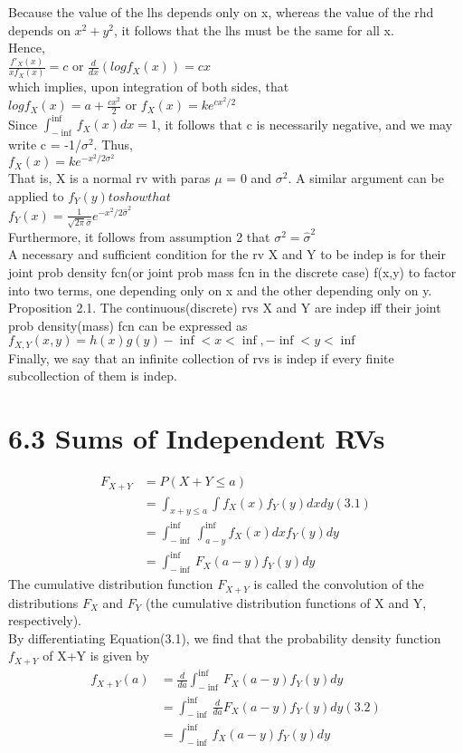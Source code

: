 \documentclass{article}
\begin{document}
Because the value of the lhs depends only on x, whereas the value of the rhd depends on $x^2 + y^2$, it follows that the lhs must be the same for all x. \\
Hence,\\
$\frac{f'_X(x)}{x f_X(x)}=c$ or $\frac{d}{dx}(log f_X(x))=c x$\\
which implies, upon integration of both sides, that \\
$log f_X(x)= a + \frac{cx^2}{2}$ or $f_X(x)=k e^{c x^2/2}$\\
Since $\int_{-\inf}^{\inf}f_X(x)dx =1$, it follows that c is necessarily negative, and we may write c = -1/$\sigma^2$. Thus, \\
$f_X(x)=k e^{-x^2/2\sigma^2}$\\
That is, X is a normal rv with paras $\mu$ = 0 and $\sigma^2$. A similar argument can be applied to $f_Y(y) to show that$ \\ 
$f_Y(x)=\frac{1}{\sqrt{2\pi}\hat{\sigma}}e^{-x^2/2\hat{\sigma}^2}$\\
Furthermore, it follows from assumption 2 that $\sigma^2 = \hat{\sigma}^2$  \\
A necessary and sufficient condition for the rv X and  Y to be indep is for their joint prob density fcn(or joint prob mass fcn in the discrete case) f(x,y) to factor into two terms, one depending only on x and the other depending only on y. \\
Proposition 2.1. The continuous(discrete) rvs X and Y are indep iff their joint prob density(mass) fcn can be expressed as \\
$f_{X,Y}(x,y) = h(x)g(y) -\inf < x < \inf, -\inf<y<\inf$ \\
Finally, we say that an infinite collection of rvs is indep if every finite subcollection of them is indep.
\section*{6.3 Sums of Independent RVs}
\begin{align*}
    F_{X+Y} &= P(X + Y \leq a) \\
            &= \int_{x+y \leq a}\int f_X(x)f_Y(y)dxdy (3.1) \\
            &= \int_{-\inf}^{\inf}\int_{a-y}^{\inf}f_X(x)dx f_Y(y)dy \\
            &= \int_{-\inf}^{\inf}F_X(a-y)f_Y(y)dy
\end{align*}
The cumulative distribution function $F_{X+Y}$ is called the convolution of the distributions $F_X$ and $F_Y$ (the cumulative distribution functions of X and Y, respectively). \\
By differentiating Equation(3.1), we find that the probability density function $f_{X+Y}$ of X+Y is given by 
\begin{align*}
    f_{X+Y}(a)  &= \frac{d}{da}\int_{-\inf}^{\inf}F_X(a-y)f_Y(y)dy \\
                &= \int_{-\inf}^{\inf}\frac{d}{da}F_X(a-y)f_Y(y)dy (3.2)\\
                &= \int_{-\inf}^{\inf}f_X(a-y)f_Y(y)dy  
\end{align*}
\end{document}
